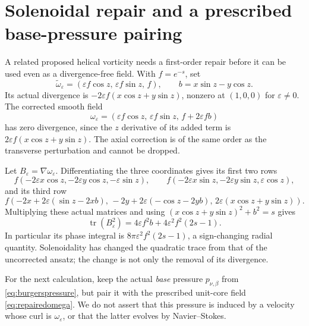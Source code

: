 \documentclass[11pt]{article}
\begin{document}
\section{Solenoidal repair and a prescribed base-pressure pairing}
A related proposed helical vorticity needs a first-order repair before
it can be used even as a divergence-free field. With $f=e^{-s}$, set
\[
 \widetilde\omega_\varepsilon
   =(\varepsilon f\cos z,\,\varepsilon f\sin z,\,f),\qquad
 b=x\sin z-y\cos z.
\]
Its actual divergence is
$-2\varepsilon f(x\cos z+y\sin z)$, nonzero at $(1,0,0)$ for
$\varepsilon\ne0$. The corrected smooth field
\begin{equation}\label{eq:repairedomega}
 \omega_\varepsilon
 =(\varepsilon f\cos z,\,\varepsilon f\sin z,\,
   f+2\varepsilon fb)
\end{equation}
has zero divergence, since the $z$ derivative of its added term is
$2\varepsilon f(x\cos z+y\sin z)$. The axial correction is of the
same order as the transverse perturbation and cannot be dropped.

Let $B_\varepsilon=\nabla\omega_\varepsilon$. Differentiating the three
coordinates gives its first two rows
\[
 f(-2\varepsilon x\cos z,-2\varepsilon y\cos z,-\varepsilon\sin z),
 \qquad
 f(-2\varepsilon x\sin z,-2\varepsilon y\sin z,\varepsilon\cos z),
\]
and its third row
\[
 f(-2x+2\varepsilon(\sin z-2xb),\,
   -2y+2\varepsilon(-\cos z-2yb),\,
   2\varepsilon(x\cos z+y\sin z)).
\]
Multiplying these actual matrices and using
$(x\cos z+y\sin z)^2+b^2=s$ gives
\begin{equation}\label{eq:repairedtrace}
 \operatorname{tr}(B_\varepsilon^2)
 =4\varepsilon f^2b+4\varepsilon^2 f^2(2s-1).
\end{equation}
In particular its phase integral is
$8\pi\varepsilon^2 f^2(2s-1)$, a sign-changing radial quantity.
Solenoidality has changed the quadratic trace from that of the
uncorrected ansatz; the change is not only the removal of its divergence.

For the next calculation, keep the actual \emph{base} pressure
$p_{\nu,\beta}$ from \eqref{eq:burgerspressure}, but pair it with the
prescribed unit-core field \eqref{eq:repairedomega}. We do not assert
that this pressure is induced by a velocity whose curl is
$\omega_\varepsilon$, or that the latter evolves by Navier--Stokes.
\end{document}
